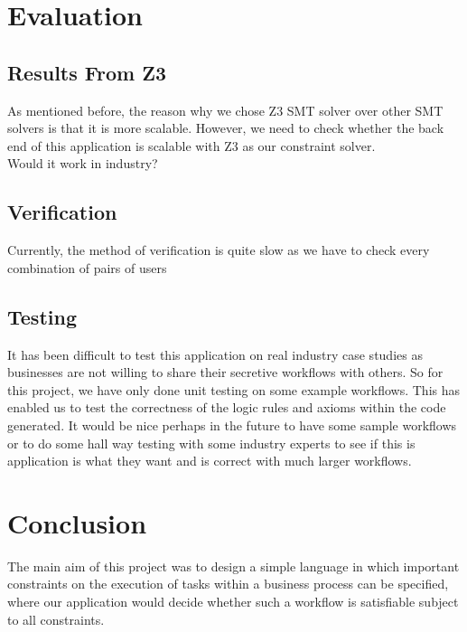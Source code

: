 \documentclass[a4paper]{report}
\begin{document}
\chapter{Evaluation}
\section{Results From Z3}
As mentioned before, the reason why we chose Z3 SMT solver over other SMT solvers is that it is more scalable. However, we need to check whether the back end of this application is scalable with Z3 as our constraint solver. \\

Would it work in industry?

\section{Verification}
Currently, the method of verification is quite slow as we have to check every combination of pairs of users 

\section{Testing}
It has been difficult to test this application on real industry case studies as businesses are not willing to share their secretive workflows with others. So for this project, we have only done unit testing on some example workflows. This has enabled us to test the correctness of the logic rules and axioms within the code generated. It would be nice perhaps in the future to have some sample workflows or to do some hall way testing with some industry experts to see if this is application is what they want and is correct with much larger workflows.

\chapter{Conclusion}
The main aim of this project was to design a simple language in which important constraints on the execution of tasks within a business process can be specified, where our application would decide whether such a workflow is satisfiable subject to all constraints.
\end{document}
